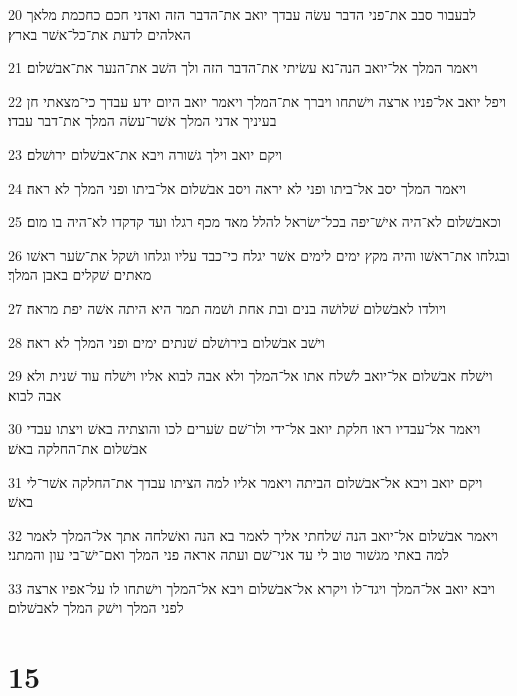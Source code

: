 \par 20 לבעבור סבב את־פני הדבר עשׂה עבדך יואב את־הדבר הזה ואדני חכם כחכמת מלאך האלהים לדעת את־כל־אשׁר בארץ׃
\par 21 ויאמר המלך אל־יואב הנה־נא עשׂיתי את־הדבר הזה ולך השׁב את־הנער את־אבשׁלום׃
\par 22 ויפל יואב אל־פניו ארצה וישׁתחו ויברך את־המלך ויאמר יואב היום ידע עבדך כי־מצאתי חן בעיניך אדני המלך אשׁר־עשׂה המלך את־דבר עבדו׃
\par 23 ויקם יואב וילך גשׁורה ויבא את־אבשׁלום ירושׁלם׃
\par 24 ויאמר המלך יסב אל־ביתו ופני לא יראה ויסב אבשׁלום אל־ביתו ופני המלך לא ראה׃
\par 25 וכאבשׁלום לא־היה אישׁ־יפה בכל־ישׂראל להלל מאד מכף רגלו ועד קדקדו לא־היה בו מום׃
\par 26 ובגלחו את־ראשׁו והיה מקץ ימים לימים אשׁר יגלח כי־כבד עליו וגלחו ושׁקל את־שׂער ראשׁו מאתים שׁקלים באבן המלך׃
\par 27 ויולדו לאבשׁלום שׁלושׁה בנים ובת אחת ושׁמה תמר היא היתה אשׁה יפת מראה׃
\par 28 וישׁב אבשׁלום בירושׁלם שׁנתים ימים ופני המלך לא ראה׃
\par 29 וישׁלח אבשׁלום אל־יואב לשׁלח אתו אל־המלך ולא אבה לבוא אליו וישׁלח עוד שׁנית ולא אבה לבוא׃
\par 30 ויאמר אל־עבדיו ראו חלקת יואב אל־ידי ולו־שׁם שׂערים לכו והוצתיה באשׁ ויצתו עבדי אבשׁלום את־החלקה באשׁ׃
\par 31 ויקם יואב ויבא אל־אבשׁלום הביתה ויאמר אליו למה הציתו עבדך את־החלקה אשׁר־לי באשׁ׃
\par 32 ויאמר אבשׁלום אל־יואב הנה שׁלחתי אליך לאמר בא הנה ואשׁלחה אתך אל־המלך לאמר למה באתי מגשׁור טוב לי עד אני־שׁם ועתה אראה פני המלך ואם־ישׁ־בי עון והמתני׃
\par 33 ויבא יואב אל־המלך ויגד־לו ויקרא אל־אבשׁלום ויבא אל־המלך וישׁתחו לו על־אפיו ארצה לפני המלך וישׁק המלך לאבשׁלום׃

\chapter{15}


